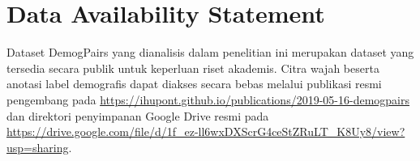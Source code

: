 \section*{Data Availability Statement}
Dataset DemogPairs yang dianalisis dalam penelitian ini merupakan dataset yang tersedia secara publik untuk keperluan riset akademis. Citra wajah beserta anotasi label demografis dapat diakses secara bebas melalui publikasi resmi pengembang pada \url{https://ihupont.github.io/publications/2019-05-16-demogpairs} dan direktori penyimpanan Google Drive resmi pada \url{https://drive.google.com/file/d/1f_ez-ll6wxDXScrG4ceStZRuLT_K8Uy8/view?usp=sharing}.
